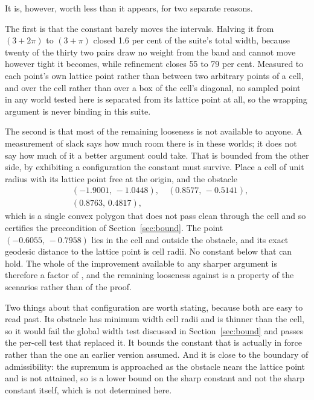 \documentclass[journal]{IEEEtran}
\begin{document}
It is, however, worth less than it appears, for two separate reasons.

The first is that the constant barely moves the intervals. Halving it from
$(3 + 2\pi)$ to $(3 + \pi)$ closed 1.6 per cent of the suite's total width,
because twenty of the thirty two pairs draw no weight from the band and cannot
move however tight it becomes, while refinement closes 55 to 79 per cent.
Measured to each point's own lattice point rather than between two arbitrary
points of a cell, and over the cell rather than over a box of the cell's
diagonal, no sampled point in any world tested here is separated from its
lattice point at all, so the wrapping argument is never binding in this suite.

The second is that most of the remaining looseness is not available to anyone.
A measurement of slack says how much room there is in these worlds; it does not
say how much of it a better argument could take. That is bounded from the other
side, by exhibiting a configuration the constant must survive. Place a cell of
unit radius with its lattice point free at the origin, and the obstacle
\[
  \begin{aligned}
    &(-1.9001,\,-1.0448),\quad (0.8577,\,-0.5141),\\
    &(0.8763,\,0.4817),
  \end{aligned}
\]
which is a single convex polygon that does not pass clean through the cell and
so certifies the precondition of Section~\ref{sec:bound}. The point
$(-0.6055,\,-0.7958)$ lies in the cell and outside the obstacle, and its exact
geodesic distance to the lattice point is \detourLowerBound{} cell radii. No
constant below that can hold. The whole of the improvement available to any
sharper argument is therefore a factor of \detourRecoverable{}, and the
remaining looseness against \detourMeasured{} is a property of the scenarios
rather than of the proof.

Two things about that configuration are worth stating, because both are easy to
read past. Its obstacle has minimum width \detourLowerWidth{} cell radii and is
thinner than the cell, so it would fail the global width test discussed in
Section~\ref{sec:bound} and passes the per-cell test that replaced it. It
bounds the constant that is actually in force rather than the one an earlier
version assumed. And it is close to the boundary of admissibility: the
supremum is approached as the obstacle nears the lattice point and is not
attained, so \detourLowerBound{} is a lower bound on the sharp constant and not
the sharp constant itself, which is not determined here.
\end{document}
